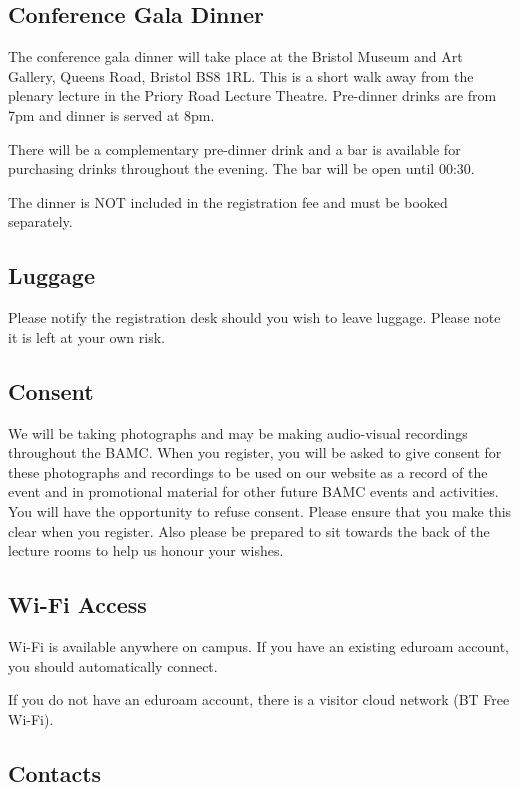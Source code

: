 \documentclass[12pt,a4paper]{article}
\begin{document}
\subsection{Conference Gala Dinner}

The conference gala dinner will take place at the Bristol Museum and Art Gallery, Queens Road, Bristol BS8 1RL. This is a short walk away from the plenary lecture in the Priory Road Lecture Theatre. Pre-dinner drinks are from 7pm and dinner is served at 8pm.

There will be a complementary pre-dinner drink and a bar is available for purchasing drinks throughout the evening. The bar will be open until 00:30.

The dinner is NOT included in the registration fee and must be booked separately.

\subsection{Luggage}

Please notify the registration desk should you wish to leave luggage. Please note it is left at your own risk.

\subsection{Consent}

We will be taking photographs and may be making audio-visual recordings throughout the BAMC. When you register, you will be asked to give consent for these photographs and recordings to be used on our website as a record of the event and in promotional material for other future BAMC events and activities. You will have the opportunity to refuse consent. Please ensure that you make this clear when you register. Also please be prepared to sit towards the back of the lecture rooms to help us honour your wishes.

\subsection{Wi-Fi Access}

Wi-Fi is available anywhere on campus. If you have an existing eduroam account, you should automatically connect. 

If you do not have an eduroam account, there is a visitor cloud network (BT Free Wi-Fi).

\subsection{Contacts}
\end{document}
